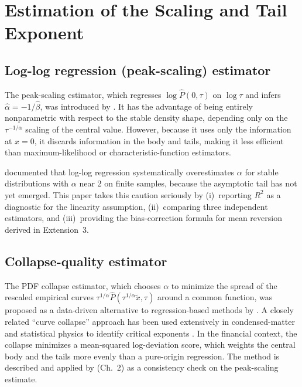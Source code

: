 \documentclass[12pt,a4paper]{article}
\begin{document}
\section{Estimation of the Scaling and Tail Exponent}
\label{sec:estimation}

\subsection{Log-log regression (peak-scaling) estimator}

The peak-scaling estimator, which regresses $\log\widehat{P}(0,\tau)$ on
$\log\tau$ and infers $\hat\alpha = -1/\hat\beta$, was introduced by
\textcite{MantegnaStanley1994}. It has the advantage of being entirely
nonparametric with respect to the stable density shape, depending only on the
$\tau^{-1/\alpha}$ scaling of the central value. However, because it uses only
the information at $x = 0$, it discards information in the body and tails,
making it less efficient than maximum-likelihood or characteristic-function
estimators.

\textcite{Weron2001} documented that log-log regression systematically
overestimates $\alpha$ for stable distributions with $\alpha$ near 2 on finite
samples, because the asymptotic tail has not yet emerged. This paper takes this
caution seriously by (i)~reporting $R^2$ as a diagnostic for the linearity
assumption, (ii)~comparing three independent estimators, and (iii)~providing
the bias-correction formula for mean reversion derived in Extension~3.

\subsection{Collapse-quality estimator}

The PDF collapse estimator, which chooses $\alpha$ to minimize the spread of the
rescaled empirical curves $\tau^{1/\alpha}\widehat{P}(\tau^{1/\alpha}\tilde{x},\tau)$
around a common function, was proposed as a data-driven alternative to
regression-based methods by \textcite{Drozdz2003}. A closely related
``curve collapse'' approach has been used extensively in condensed-matter and
statistical physics to identify critical exponents \parencite{Houdayer2004}.
In the financial context, the collapse minimizes a mean-squared log-deviation
score, which weights the central body and the tails more evenly than a
pure-origin regression. The method is described and applied by
\textcite{BouchaudPotters2003} (Ch.~2) as a consistency check on the
peak-scaling estimate.
\end{document}
